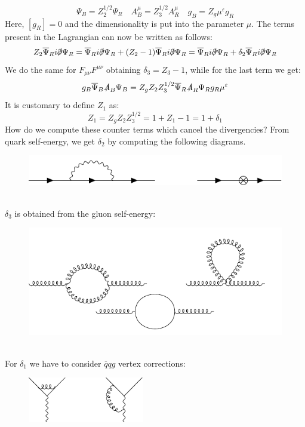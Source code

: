 \documentclass[../main.tex]{subfiles}
\begin{document}
\[
\Psi_B=Z_2^{1/2}\Psi_R \quad A^\mu_B=Z_3^{1/2}A^\mu_R \quad g_B=Z_g\mu^\varepsilon g_R
\]
Here, $[g_R]=0$ and the dimensionality is put into the parameter $\mu$. The terms present in the Lagrangian can now be written as follows:
\[
Z_2\overline{\Psi}_Ri\slashed{\partial}\Psi_R=\overline{\Psi}_Ri\slashed{\partial}\Psi_R+(Z_2-1)\overline{\Psi}_Ri\slashed{\partial}\Psi_R=\overline{\Psi}_Ri\slashed{\partial}\Psi_R+\delta_2\overline{\Psi}_Ri\slashed{\partial}\Psi_R
\]
We do the same for $F_{\mu\nu}F^{\mu\nu}$ obtaining $\delta_3=Z_3-1$, while for the last term we get:
\[
g_B\overline{\Psi}_B\slashed{A}_B\Psi_B=Z_gZ_2Z_3^{1/2}\overline{\Psi}_R\slashed{A}_R\Psi_Rg_R\mu^\varepsilon
\]
It is customary to define $Z_1$ as:
\[
Z_1=Z_gZ_2Z_3^{1/2}=1+Z_1-1=1+\delta_1
\]
How do we compute these counter terms which cancel the divergencies? From quark self-energy, we get $\delta_2$ by computing the following diagrams.\\
\begin{figure}[h]
    \centering
    \includegraphics{Images/delta2.pdf}
    \caption*{}
\end{figure}\\
\newline
\newline
$\delta_3$ is obtained from the gluon self-energy:\\
\begin{figure}[h]
    \centering
    \includegraphics{Images/delta3.pdf}
    \caption*{}
\end{figure}\\
For $\delta_1$ we have to consider $\overline{q}qg$ vertex corrections:\\
\begin{figure}[h]
    \centering
    \includegraphics[width=0.45\textwidth]{Images/delta1.pdf}
    \caption*{}
\end{figure}\\
\end{document}
